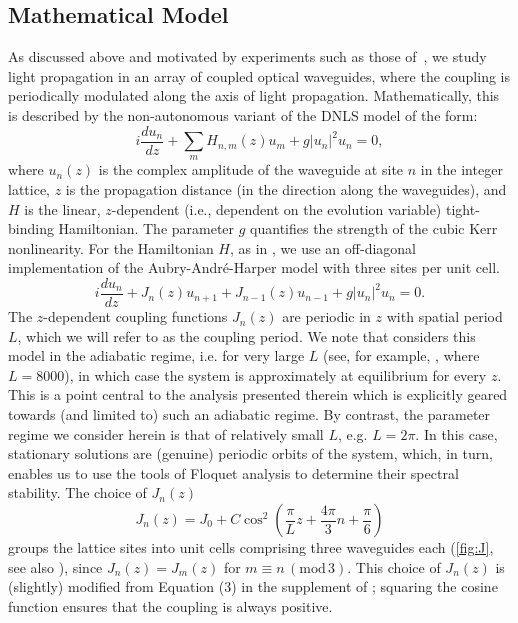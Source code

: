 \documentclass[reprint, amsmath,amssymb,aps,pre]{revtex4-2}
\begin{document}
\subsection{Mathematical Model}

As discussed above and motivated by experiments such as those of~\cite{PhysRevLett.128.113901,Jurgensen2021}, we study light propagation in an array of coupled optical waveguides, where the coupling is periodically modulated along the axis of light propagation. Mathematically, this is described by the 
non-autonomous variant of the DNLS model of the form:
\begin{equation}\label{eq:DNLSH}
i \frac{d u_n}{d z} + \sum_m H_{n,m}(z)u_m + g|u_n|^2 u_n = 0,
\end{equation}
where $u_n(z)$ is the complex amplitude of the waveguide at site $n$ in the integer lattice, $z$ is the propagation distance (in the direction along the waveguides), and $H$ is the linear, $z$-dependent (i.e., dependent on the
evolution variable) tight-binding Hamiltonian. The parameter $g$ quantifies the strength of the cubic Kerr nonlinearity. For the Hamiltonian $H$, as in \cite{Jurgensen2021}, we use an off-diagonal implementation of the Aubry-Andr\'e-Harper model \cite{Aubry1980,Harper1955} with three sites per unit cell. 
\begin{equation}\label{eq:model}
i \frac{d u_n}{d z} + J_n(z) u_{n+1} + J_{n-1}(z)u_{n-1} + g|u_n|^2 u_n = 0.
\end{equation}
The $z$-dependent coupling functions $J_n(z)$ are periodic in $z$ with spatial period $L$, which we will refer to as the coupling period. We note that \cite{Jurgensen2021} considers this model in the adiabatic regime, i.e. for very large $L$ (see, for example, \cite[Figure 2]{Jurgensen2021}, where $L=8000$), in which case the system is approximately at equilibrium for every $z$. 
This is a point central to the analysis presented therein which is 
explicitly geared towards (and limited to) such an adiabatic regime.
By contrast, the parameter regime we consider herein is that of relatively small $L$, e.g. $L=2\pi$. In this case, stationary solutions are (genuine) periodic orbits of the system, which, in turn, enables us to use the tools of Floquet analysis to determine their spectral stability.
The choice of $J_n(z)$
\begin{equation}\label{eq:Jn}
J_n(z) = J_0 + C \cos^2\left( \frac{\pi}{L}z + \frac{4 \pi}{3} n + \frac{\pi}{6} \right)
\end{equation}
groups the lattice sites into unit cells comprising three waveguides each (\cref{fig:J}, see also \cite[Figure 1]{Jurgensen2021}), since $J_n(z) = J_m(z)$ for $m \equiv n\,(\text{mod}\,3)$. This choice of $J_n(z)$ is (slightly) modified from Equation (3) in the supplement of \cite{Jurgensen2021}; squaring the cosine function ensures that the coupling is always positive.
\end{document}

